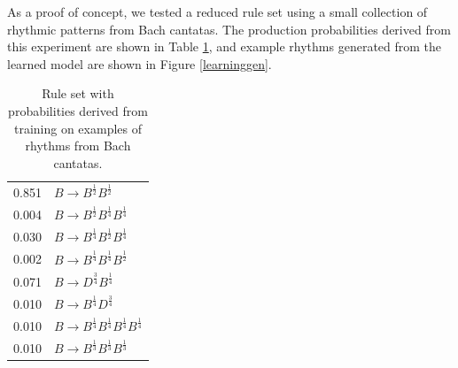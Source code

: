 \documentclass{article}
\begin{document}
As a proof of concept, we tested a reduced rule set using a small collection of rhythmic patterns from Bach cantatas. The production probabilities derived from this experiment are shown in Table \ref{simplerules}, and example rhythms generated from the learned model are shown in Figure \ref{learninggen}.

\begin{table}
\centering
\begin{tabular}{ll}
0.851 & $B \rightarrow B^\frac{1}{2} B^\frac{1}{2}$\\
0.004 & $B \rightarrow B^\frac{1}{2} B^\frac{1}{4} B^\frac{1}{4}$\\
0.030 & $B \rightarrow B^\frac{1}{4} B^\frac{1}{2} B^\frac{1}{4}$\\ 
0.002 & $B \rightarrow B^\frac{1}{4} B^\frac{1}{4} B^\frac{1}{2}$\\ 
0.071 & $B \rightarrow D^\frac{3}{4} B^\frac{1}{4}$\\
0.010 & $B \rightarrow B^\frac{1}{4} D^\frac{3}{4}$\\
0.010 & $B \rightarrow B^\frac{1}{4} B^\frac{1}{4} B^\frac{1}{4} B^\frac{1}{4}$\\
0.010 & $B \rightarrow B^\frac{1}{3} B^\frac{1}{3} B^\frac{1}{3}$\\ 
\end{tabular}
\caption{Rule set with probabilities derived from training on examples of rhythms from Bach cantatas.}\label{simplerules}
\end{table}
\end{document}
